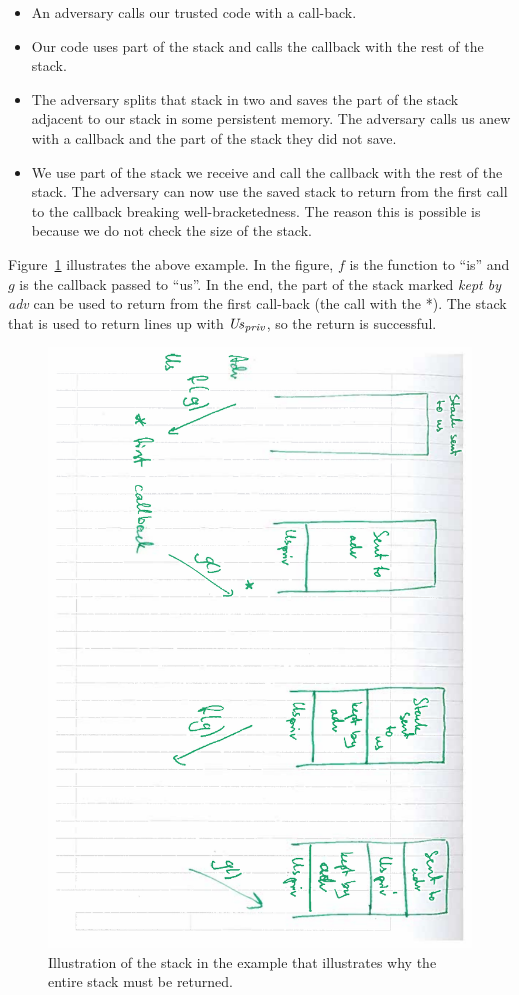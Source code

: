 \documentclass[a4paper]{article}
\begin{document}
\begin{itemize}
\item An adversary calls our trusted code with a call-back. 
\item Our code uses part of the stack and calls the callback with the rest of the stack.
\item The adversary splits that stack in two and saves the part of the stack adjacent to our stack in some persistent memory. The adversary calls us anew with a callback and the part of the stack they did not save. 
\item We use part of the stack we receive and call the callback with the rest of the stack. The adversary can now use the saved stack to return from the first call to the callback breaking well-bracketedness. The reason this is possible is because we do not check the size of the stack.
\end{itemize}
Figure~\ref{fig:ret-full-stk} illustrates the above example. In the figure, $f$ is the function to ``is'' and $g$ is the callback passed to ``us''. In the end, the part of the stack marked \emph{kept by adv} can be used to return from the first call-back (the call with the *). The stack that is used to return lines up with $\mathit{Us}_{\mathit{priv}}$, so the return is successful.
\begin{figure}
  \centering
  \includegraphics[angle=90,width=\textwidth]{img/ret-full-stk.pdf}
  \caption{Illustration of the stack in the example that illustrates why the entire stack must be returned.}
  \label{fig:ret-full-stk}
\end{figure}
\end{document}
